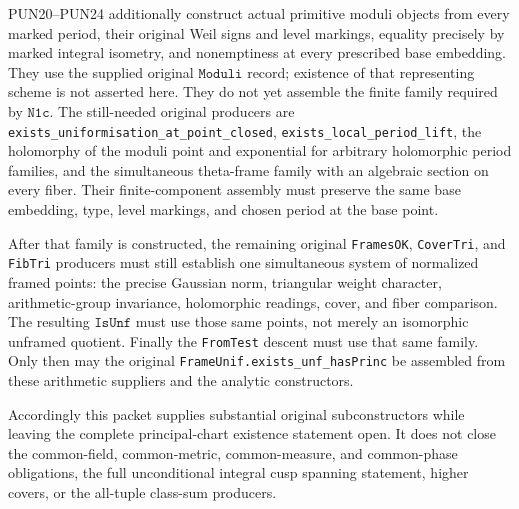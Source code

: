 PUN20--PUN24 additionally construct actual primitive moduli
objects from every marked period, their original Weil signs
and level markings, equality precisely by marked integral
isometry, and nonemptiness at every prescribed base embedding.
They use the supplied original \(\texttt{Moduli}\) record;
existence of that representing scheme is not asserted here.
They do not yet assemble the finite family required by
\(\texttt{N1c}\).  The still-needed original producers are
\texttt{exists\_uniformisation\_at\_point\_closed},
\texttt{exists\_local\_period\_lift}, the holomorphy of the
moduli point and exponential for arbitrary holomorphic period
families, and the simultaneous theta-frame family with an
algebraic section on every fiber.  Their finite-component
assembly must preserve the same base embedding, type, level
markings, and chosen period at the base point.

After that family is constructed, the remaining original
\texttt{FramesOK}, \texttt{CoverTri}, and \texttt{FibTri}
producers must still establish one simultaneous system of
normalized framed points: the precise Gaussian norm,
triangular weight character, arithmetic-group invariance,
holomorphic readings, cover, and fiber comparison.  The
resulting \(\texttt{IsUnf}\) must use those same points,
not merely an isomorphic unframed quotient.  Finally the
\texttt{FromTest} descent must use that same family.  Only
then may the original
\texttt{FrameUnif.exists\_unf\_hasPrinc} be assembled from
these arithmetic suppliers and the analytic constructors.

Accordingly this packet supplies substantial original
subconstructors while leaving the complete principal-chart
existence statement open.  It does not close the common-field,
common-metric, common-measure, and common-phase obligations,
the full unconditional integral cusp spanning statement,
higher covers, or the all-tuple class-sum producers.
